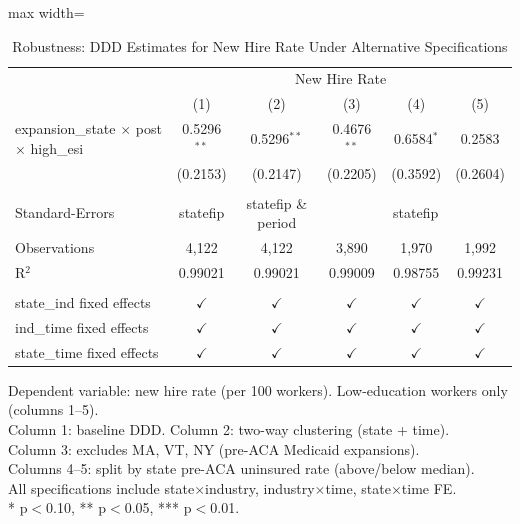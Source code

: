 
\begin{table}[htbp]
   \caption{\label{tab:robustness} Robustness: DDD Estimates for New Hire Rate Under Alternative Specifications}
   \bigskip
   \centering
   \begin{adjustbox}{max width=\textwidth}
   \begin{tabular}{lccccc}
      \toprule
       & \multicolumn{5}{c}{New Hire Rate}\\
                                                            & (1)           & (2)           & (3)           & (4)           & (5)\\  
      \midrule 
      expansion\_state $\times$ post $\times$ high\_esi     & 0.5296$^{**}$ & 0.5296$^{**}$ & 0.4676$^{**}$ & 0.6584$^{*}$  & 0.2583\\   
                                                            & (0.2153)      & (0.2147)      & (0.2205)      & (0.3592)      & (0.2604)\\   
       \\
      Standard-Errors & statefip & statefip \& period & \multicolumn{3}{c}{statefip} \\ 
      Observations                                          & 4,122         & 4,122         & 3,890         & 1,970         & 1,992\\  
      R$^2$                                                 & 0.99021       & 0.99021       & 0.99009       & 0.98755       & 0.99231\\  
       \\
      state\_ind fixed effects                              & $\checkmark$  & $\checkmark$  & $\checkmark$  & $\checkmark$  & $\checkmark$\\   
      ind\_time fixed effects                               & $\checkmark$  & $\checkmark$  & $\checkmark$  & $\checkmark$  & $\checkmark$\\   
      state\_time fixed effects                             & $\checkmark$  & $\checkmark$  & $\checkmark$  & $\checkmark$  & $\checkmark$\\   
      \bottomrule
   \end{tabular}
   \end{adjustbox}
   
   \par \raggedright 
   Dependent variable: new hire rate (per 100 workers). Low-education workers only (columns 1--5).\\
   Column 1: baseline DDD. Column 2: two-way clustering (state + time).\\
   Column 3: excludes MA, VT, NY (pre-ACA Medicaid expansions).\\
   Columns 4--5: split by state pre-ACA uninsured rate (above/below median).\\
   All specifications include state$\times$industry, industry$\times$time, state$\times$time FE.\\
   * p$<$0.10, ** p$<$0.05, *** p$<$0.01.
\end{table}


